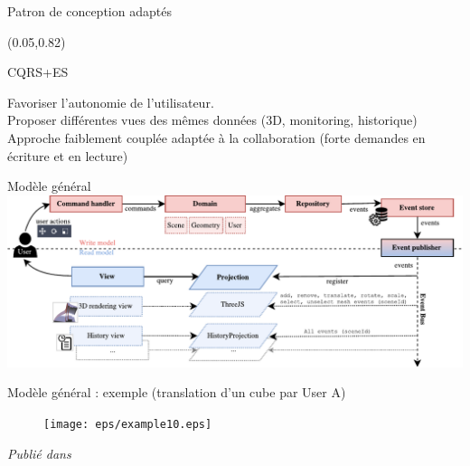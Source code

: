 \begin{frame}{Patron de conception adaptés}
{\begin{textblock*}{15cm}
	\end{textblock*}
	
	\begin{textblock*}{15cm}(0.05\textwidth,0.82\textheight)
		
		\begin{exampleblock}{CQRS+ES}
			
			Favoriser l'autonomie de l'utilisateur.\\
			Proposer différentes vues des mêmes données (3D, monitoring, 
			historique)\\
			Approche faiblement couplée adaptée à la collaboration (forte demandes 
			en 
			écriture et en lecture)
		\end{exampleblock}
		
	\end{textblock*}
}
\end{frame}

\begin{frame}{Modèle général \cite{Desprat2016}}
\centering
		\includegraphics[width=0.9\columnwidth]{eps/cqrs3.pdf}

\end{frame}


\begin{frame}{Modèle général : exemple (translation d'un cube par User A)}

	\begin{figure}
		\centering
		\texttt{[image: eps/example10.eps]}
	
	\end{figure}

\textit{Publié dans }
\end{frame}



